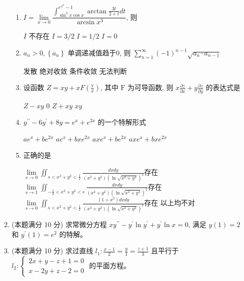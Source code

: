 \begin{enumerate}
\begin{enumerate}
\item 
$I=\lim\limits _{x \rightarrow 0} \dfrac{\int_{\sin ^{3} x \cos x}^{e^{x^{2}}-1} \arctan \frac{3 t}{2+t} d t}{\arcsin x^{3}}$, 则  

\fourchoices
{$I$ 不存在}
{$I=3 / 2$}
{$I=1 / 2$}
{$I=0$}

\item 
$a_{n}>0,\left\{a_{n}\right\}$ 单调递减值趋于$  0  $, 则 $\sum\limits_{n=1}^{\infty}(-1)^{n-1} \sqrt{a_{n} \cdot a_{n-1}}$  
 

\fourchoices
{发散}
{绝对收敛}
{条件收敛}
{无法判断}

\item 
设函数 $Z=x y+x F\left(\frac{\mathrm{y}}{x}\right)$, 其中 $\mathrm{F}$ 为可导函数, 则 $x \frac{\partial z}{\partial x}+y \frac{\partial z}{\partial y}$ 的表达式是  

\fourchoices
{$Z-x y$}
{$ 0 $}
{$Z+x y$}
{$x y$}

\item 
$y^{\prime \prime}-6 y^{\prime}+8 y=e^{x}+e^{2 x}$ 的一个特解形式  


\fourchoices
{$a e^{x}+b e^{2 x} $}
{$ a e^{x}+b x e^{2 x} $}
{$a x e^{x}+b e^{2x} $}
{$ a x e^{x}+b x e^{2 x}$}

\item 
正确的是  


\fourchoices
{$\lim\limits _{s \rightarrow 0} \iint_{s <x^{2}+y^{2}< \frac{ 1 }{ 2 } } \frac{d x d y}{\left(x^{2}+y^{2}\right)\left(\ln \sqrt{x^{2}+y^{2}}\right)^{2}}$存在}
{$\lim\limits _{s \rightarrow 1} \iint_{-\frac{1}{2}<x^{2}+y^{2}<s} \frac{d x d y}{\left(x^{2}+y^{2}\right)\left(\ln \sqrt{x^{2}+y^{2}}\right)^{2}} $存在}
{$\lim\limits _{s \rightarrow 0} \iint_{s <x^{2}+y^{2}< \frac{ 1 }{ 2 } } \frac{\left(1+x^{2}\right) d x d y}{\left(x^{2}+y^{2}\right)\left(\ln \sqrt{x^{2}+y^{2}}\right)^{2}}$存在}
{以上均不对}




\end{enumerate}

	

\item 
(本题满分 10 分)
求常微分方程 $x y^{\prime \prime}-y^{\prime} \ln y^{\prime}+y^{\prime} \ln x=0$, 满足 $y(1)=2$ 和 $y^{\prime}(1)=e^{2}$ 的特解。




\item 
(本题满分 10 分)
求过直线 $l_{1}: \frac{x-1}{2}=\frac{y}{1}=\frac{z+1}{3}$ 且平行于 $l_{2}:\left\{\begin{array}{l}2 x+y-z+1=0 \\ x-2 y+z-2=0\end{array}\right.$ 的平面方程。


\end{enumerate}
